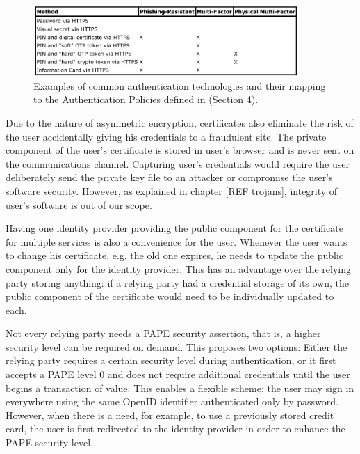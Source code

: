 \documentclass{tktltiki}
\begin{document}
        
\begin{figure}
  \centering
  \includegraphics[width=0.9\textwidth]{images/openid_authentication_policy_examples.jpg}
  \caption{Examples of common authentication technologies and their mapping to the Authentication Policies defined in \cite{openid_2.0_pape_phishing_07} (Section 4).}    
  \label{fig:openid_policy_examples}
\end{figure}


    Due to the nature of asymmetric encryption, certificates also eliminate the risk of the user accidentally giving his credentials to a fraudulent site. The private component of the user's certificate is stored in user's browser and is never sent on the communications channel. Capturing user's credentials would require the user deliberately send the private key file to an attacker or compromise the user's software security. However, as explained in chapter [REF trojans], integrity of user's software is out of our scope. 

      Having one identity provider providing the public component for the certificate for multiple services is also a convenience for the user. Whenever the user wants to change his certificate, e.g. the old one expires, he needs to update the public component only for the identity provider. This has an advantage over the relying party storing anything: if a relying party had a credential storage of its own, the public component of the certificate would need to be individually updated to each.

      Not every relying party needs a PAPE security assertion, that is, a higher security level can be required on demand. This proposes two options: Either the relying party requires a certain security level during authentication, or it first accepts a PAPE level 0 and does not require additional credentials until the user begins a transaction of value. This enables a flexible scheme: the user may sign in everywhere using the same OpenID identifier authenticated only by password. However, when there is a need, for example, to use a previously stored credit card, the user is first redirected to the identity provider in order to enhance the PAPE security level.
      
\end{document}
